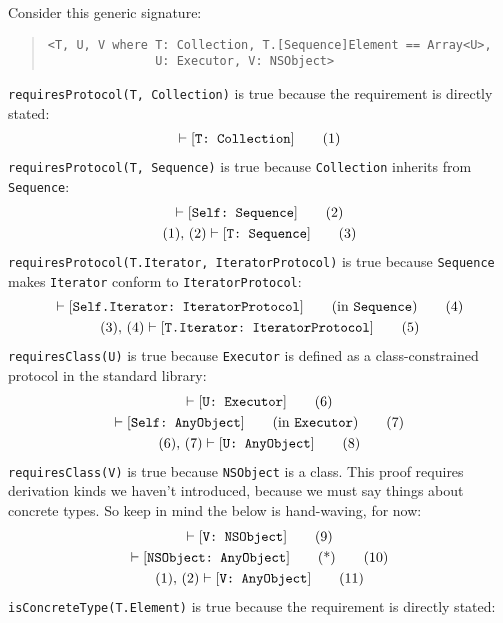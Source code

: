 \documentclass[../generics]{subfiles}
\begin{document}
\begin{example}
Consider this generic signature:
\begin{quote}
\begin{verbatim}
<T, U, V where T: Collection, T.[Sequence]Element == Array<U>,
               U: Executor, V: NSObject>
\end{verbatim}
\end{quote}
\texttt{requiresProtocol(T, Collection)} is true because the requirement is directly stated:
\begin{gather}
\vdash[\texttt{T:~Collection}]\tag{1}
\end{gather}
\texttt{requiresProtocol(T, Sequence)} is true because \texttt{Collection} inherits from \texttt{Sequence}:
\begin{gather*}
\vdash [\texttt{Self:~Sequence}]\tag{2}\\
(1),\,(2)\vdash [\texttt{T:~Sequence}]\tag{3}
\end{gather*}
\texttt{requiresProtocol(T.Iterator, IteratorProtocol)} is true because \texttt{Sequence} makes \texttt{Iterator} conform to \texttt{IteratorProtocol}:
\begin{gather}
\vdash [\texttt{Self.Iterator:~IteratorProtocol}] \qquad \mbox{(in \texttt{Sequence})}\tag{4}\\
(3),\,(4)\vdash [\texttt{T.Iterator:~IteratorProtocol}]\tag{5}
\end{gather}
\texttt{requiresClass(U)} is true because \texttt{Executor} is defined as a class-constrained protocol in the standard library:
\begin{gather}
\vdash [\texttt{U:~Executor}]\tag{6}\\
\vdash [\texttt{Self:~AnyObject}]\qquad\mbox{(in \texttt{Executor})}\tag{7}\\
(6),\,(7)\vdash [\texttt{U:~AnyObject}]\tag{8}
\end{gather}
\texttt{requiresClass(V)} is true because \texttt{NSObject} is a class. This proof requires derivation kinds we haven't introduced, because we must say things about concrete types. So keep in mind the below is hand-waving, for now:
\begin{gather}
\vdash[\texttt{V:~NSObject}]\tag{9}\\
\vdash[\texttt{NSObject:~AnyObject}]\qquad\mbox{(*)}\tag{10}\\
(1),\,(2)\vdash[\texttt{V:~AnyObject}]\tag{11}
\end{gather}
\texttt{isConcreteType(T.Element)} is true because the requirement is directly stated:

\end{example}
\end{document}
